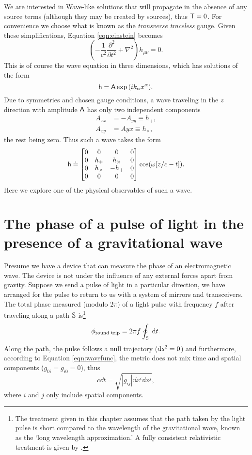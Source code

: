 We are interested in Wave-like solutions that will propagate in the absence of any source terms (although they may be created by sources), thus $\mathsf{T}=0$. %
For convenience we choose what is known as the \emph{transverse traceless} gauge. %
Given these simplifications, Equation \ref{eqn:einstein} becomes
\begin{equation}
\left(-\frac{1}{c^2}\frac{\partial^2}{\partial t^2}+\nabla^2\right)h_{\mu \nu}=0.
\end{equation}
This is of course the wave equation in three dimensions, which has solutions of the form
\begin{equation}
\mathsf{h}=\mathsf{A}\exp{(ik_\alpha x^\alpha)}.
\end{equation}
Due to symmetries and chosen gauge conditions, a wave traveling in the $z$ direction with amplitude $\mathsf{A}$ has only two independent components \cite[Chap. %
9]{schutz1985first}
\begin{align*}
A_{xx}&=-A_{yy}\equiv h_+,\\
A_{xy}&=A{yx}\equiv h_\times,
\end{align*}
the rest being zero. %
Thus such a wave takes the form
\begin{equation}
\label{eqn:wavefunc}
\mathsf{h} \doteq 
\left[\begin{matrix}
0 & 0 & 0 & 0 \\
0 & h_+ & h_\times & 0 \\
0 & h_\times & -h_+ & 0 \\
0 & 0 & 0 & 0
\end{matrix}\right]
\cos(\omega [z/c- t]).
\end{equation}
Here we explore one of the physical observables of such a wave.

\section{The phase of a pulse of light in the presence of a gravitational wave}
Presume we have a device that can measure the phase of an electromagnetic wave. %
The device is not under the influence of any external forces apart from gravity. %
Suppose we send a pulse of light in a particular direction, we have arranged for the pulse to return to us with a system of mirrors and transceivers. %
The total phase measured (modulo $2\pi$) of a light pulse with frequency $f$ after traveling along a path $\rm S$ is\footnote{The treatment given in this chapter assumes that the path taken by the light pulse is short compared to the wavelength of the gravitational wave, known as the `long wavelength approximation.' A fully consistent relativistic treatment is given by \citet{RakhmanovPhoton}.}
\begin{equation}
\phi_{\text{round trip}} = 2\pi f\oint_{\rm S} \; \mathrm{d} t.
\end{equation}
Along the path, the pulse follows a null trajectory ($\mathrm{d} s^2=0$) and furthermore, according to Equation \ref{eqn:wavefunc}, the metric does not mix time and spatial components ($g_{0i}=g_{i0}=0$), thus
\begin{equation}
c\dd t = \sqrt{|g_{ij}|\dd x^i \dd x^j},
\end{equation}
where $i$ and $j$ only include spatial components.

